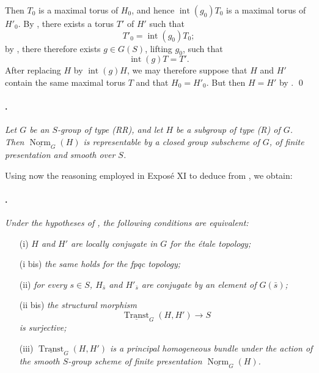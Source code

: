 Then \(T_0\) is a maximal torus of \(H_0\), and hence
\(\operatorname{int}(g_0)T_0\) is a maximal torus of \(H'_0\).
By , there exists a torus \(T'\) of \(H'\) such
that
\[
  T'_0=\operatorname{int}(g_0)T_0;
\]
by , there therefore exists \(g\in G(S)\), lifting
\(g_0\), such that
\[
  \operatorname{int}(g)T=T'.
\]
After replacing \(H\) by \(\operatorname{int}(g)H\), we may
therefore suppose that \(H\) and \(H'\) contain the same maximal
torus \(T\) and that \(H_0=H'_0\). But then \(H=H'\) by .
\qed

\paragraph{.}
\textit{Let \(G\) be an \(S\)-group of type \textup{(RR)}, and let
\(H\) be a subgroup of type \textup{(R)} of \(G\). Then
\(\underline{\operatorname{Norm}}_G(H)\) is representable by a
closed group subscheme of \(G\), of finite presentation and smooth
over \(S\).}

Using now the reasoning employed in Exposé XI to deduce 
from , we obtain:

\paragraph{.}
\textit{Under the hypotheses of , the following conditions are
equivalent:}
\begin{enumerate}
  \item[\textup{\SGAInlineRefTarget{sga3:xxii:cor:5.3.11:item:i}(i)}] \textit{\(H\) and \(H'\) are locally conjugate
  in \(G\) for the étale topology;}

  \item[\textup{(i bis)}] \textit{the same holds for the fpqc
  topology;}

  \item[\textup{(ii)}] \textit{for every \(s\in S\),
  \(H_{\bar s}\) and \(H'_{\bar s}\) are conjugate by an element of
  \(G(\bar s)\);}

  \item[\textup{(ii bis)}] \textit{the structural morphism}
  \[
    \underline{\operatorname{Transt}}_G(H,H')
      \longrightarrow S
  \]
  \textit{is surjective;}

  \item[\textup{\SGAInlineRefTarget{sga3:xxii:cor:5.3.11:item:iii}(iii)}]
  \textit{\(\underline{\operatorname{Transt}}_G(H,H')\) is a
  principal homogeneous bundle under the action of the smooth
  \(S\)-group scheme of finite presentation
  \(\underline{\operatorname{Norm}}_G(H)\).}
\end{enumerate}

